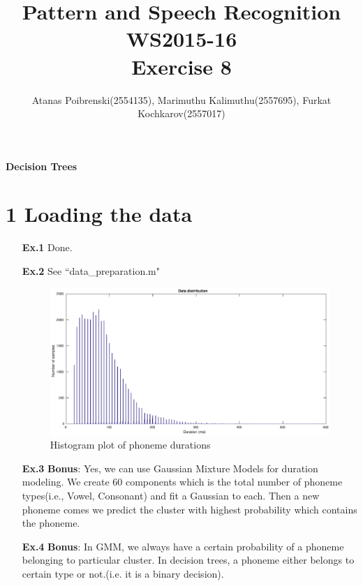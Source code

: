 \documentclass[a4paper]{article}
\title{Pattern and Speech Recognition WS2015-16 \\ Exercise 8}
\author{Atanas Poibrenski(2554135), Marimuthu Kalimuthu(2557695), Furkat Kochkarov(2557017)}
\begin{document}

\maketitle 
\begin{center}
	\textbf{Decision Trees}
\end{center}

\section*{1 Loading the data}
\begin{enumerate}
	\item[ \textbf{Ex.1} ] Done.
	\item[ \textbf{Ex.2} ] See ``data\_preparation.m"
	\begin{figure}[H]
		\begin{center}
			\includegraphics[width=1.1\textwidth]{plot.eps}
			\caption{Histogram plot of phoneme durations}\label{fig:hist}
		\end{center}
	\end{figure}

	\item[ \textbf{Ex.3} ] \textbf{Bonus}: \newline
	Yes, we can use Gaussian Mixture Models for duration modeling. We create 60 components which is the total number of phoneme types(i.e., Vowel, Consonant) and fit a Gaussian to each. Then a new phoneme comes we predict the cluster with highest probability which contains the phoneme.
	
	\item[ \textbf{Ex.4} ] \textbf{Bonus}: \newline
	In GMM, we always have a certain probability of a phoneme belonging to particular cluster. In decision trees, a phoneme either belongs to certain type or not.(i.e. it is a binary decision).


\end{enumerate}
\end{document}
